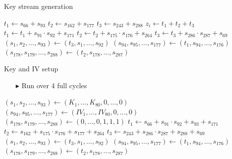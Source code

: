 \documentclass[10pt, compress]{beamer}
\begin{document}
\begin{frame}{Key stream generation}
\begin{center}
\begin{minipage}{\textwidth}
\begin{algorithm}[H]
\begin{algorithmic}[1]
 
\State $t_1 \gets s_{66} + s_{93}$
\State $t_2 \gets s_{162} + s_{177}$
\State $t_3 \gets s_{243} + s_{288}$
\State
\State $z_i \gets t_1 + t_2 + t_3$
\State
\State $t_1 \gets t_1 + s_{91} \cdot s_{92} + s_{171}$
\State $t_2 \gets t_2 + s_{175} \cdot s_{176} + s_{264}$
\State $t_3 \gets t_3 + s_{286} \cdot s_{287} + s_{69}$
\State
\State $(s_1,s_2,\dots,s_{93}) \gets (t_3,s_1,\dots,s_{92})$ 
\State $(s_{94},s_{95},\dots,s_{177}) \gets (t_1,s_{94},\dots,s_{176})$ 
\State $(s_{178},s_{179},\dots,s_{288}) \gets (t_2,s_{178},\dots,s_{287})$ 
\EndFor
\end{algorithmic}
\end{algorithm}
\end{minipage}
\end{center}
\end{frame}

\begin{frame}{Key and IV setup}
\begin{itemize}
\item[$\blacktriangleright$] Run over 4 full cycles
\end{itemize}
\begin{center}
\begin{minipage}{\textwidth}
\begin{algorithm}[H]
\begin{algorithmic}[1]
\State $(s_1,s_2,\dots,s_{93}) \gets (K_1,\dots,K_{80},0,\dots,0)$ 
\State $(s_{94},s_{95},\dots,s_{177}) \gets (IV_1,\dots,IV_{80},0,\dots,0)$ 
\State $(s_{178},s_{179},\dots,s_{288}) \gets (0,\dots,0,1,1,1)$ 
\State
{}
\State $t_1 \gets s_{66} + s_{91} \cdot s_{92} + s_{93} + s_{171}$
\State $t_2 \gets s_{162} + s_{175} \cdot s_{176} + s_{177} + s_{264}$
\State $t_3 \gets s_{243} + s_{286} \cdot s_{287} + s_{288}+ s_{69}$
\State
\State $(s_1,s_2,\dots,s_{93}) \gets (t_3,s_1,\dots,s_{92})$ 
\State $(s_{94},s_{95},\dots,s_{177}) \gets (t_1,s_{94},\dots,s_{176})$ 
\State $(s_{178},s_{179},\dots,s_{288}) \gets (t_2,s_{178},\dots,s_{287})$ 
\EndFor
\end{algorithmic}
\end{algorithm}
\end{minipage}
\end{center}



\end{frame}
\end{document}
